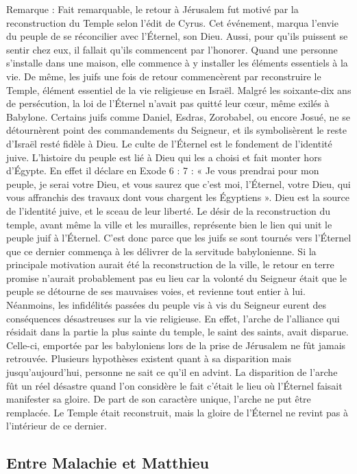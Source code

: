 Remarque : Fait remarquable, le retour à Jérusalem fut motivé par la reconstruction du Temple selon l'édit de Cyrus. Cet événement, marqua l'envie du peuple de se réconcilier avec l’Éternel, son Dieu. Aussi, pour qu'ils puissent se sentir chez eux, il fallait qu'ils commencent par l'honorer. Quand une personne s'installe dans une maison, elle commence à y installer les éléments essentiels à la vie. De même, les juifs une fois de retour commencèrent par reconstruire le Temple, élément essentiel de la vie religieuse en Israël. Malgré les soixante-dix ans de persécution, la loi de l’Éternel n'avait pas quitté leur cœur, même exilés à Babylone. Certains juifs comme Daniel, Esdras, Zorobabel, ou encore Josué, ne se détournèrent point des commandements du Seigneur, et ils symbolisèrent le reste d'Israël resté fidèle à Dieu. Le culte de l’Éternel est le fondement de l'identité juive. L'histoire du peuple est lié à Dieu qui les a choisi et fait monter hors d’Égypte. En effet il déclare en Exode 6 : 7 : « Je vous prendrai pour mon peuple, je serai votre Dieu, et vous saurez que c'est moi, l'Éternel, votre Dieu, qui vous affranchis des travaux dont vous chargent les Égyptiens ». Dieu est la source de l'identité juive, et le sceau de leur liberté. Le désir de la reconstruction du temple, avant même la ville et les murailles, représente bien le lien qui unit le peuple juif à l’Éternel. C'est donc parce que les juifs se sont tournés vers l’Éternel que ce dernier commença à les délivrer de la servitude babylonienne. Si la principale motivation aurait été la reconstruction de la ville, le retour en terre promise n'aurait probablement pas eu lieu car la volonté du Seigneur était que le peuple se détourne de ses mauvaises voies, et revienne tout entier à lui. Néanmoins, les infidélités passées du peuple vis à vis du Seigneur eurent des conséquences désastreuses sur la vie religieuse. En effet, l'arche de l'alliance qui résidait dans la partie la plus sainte du temple, le saint des saints, avait disparue. Celle-ci, emportée par les babyloniens lors de la prise de Jérusalem ne fût jamais retrouvée. Plusieurs hypothèses existent quant à sa disparition mais jusqu’aujourd’hui, personne ne sait ce qu'il en advint. La disparition de l'arche fût un réel désastre quand l'on considère le fait c'était le lieu où l’Éternel faisait manifester sa gloire. De part de son caractère unique, l'arche ne put être remplacée. Le Temple était reconstruit, mais la gloire de l’Éternel ne revint pas à l'intérieur de ce dernier.

\subsection*{Entre Malachie et Matthieu}

